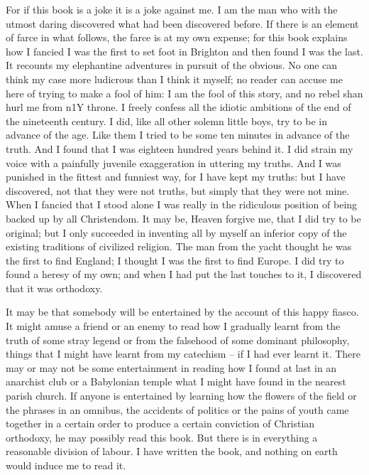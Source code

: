 \documentclass{book}
\begin{document}
For if this book is a joke it is a joke against me. I am the man who with the utmost daring discovered what had been discovered before. If there is an element of farce in what follows, the farce is at my own expense; for this book explains how I fancied I was the first to set foot in Brighton and then found I was the last. It recounts my elephantine adventures in pursuit of the obvious. No one can think my case more ludicrous than I think it myself; no reader can accuse me here of trying to make a fool of him: I am the fool of this story, and no rebel shan hurl me from n1Y throne. I freely confess all the idiotic ambitions of the end of the nineteenth century. I did, like all other solemn little boys, try to be in advance of the age. Like them I tried to be some ten minutes in advance of the truth. And I found that I was eighteen hundred years behind it. I did strain my voice with a painfully juvenile exaggeration in uttering my truths. And I was punished in the fittest and funniest way, for I have kept my truths: but I have discovered, not that they were not truths, but simply that they were not mine. When I fancied that I stood alone I was really in the ridiculous position of being backed up by all Christendom. It may be, Heaven forgive me, that I did try to be original; but I only succeeded in inventing all by myself an inferior copy of the existing traditions of civilized religion. The man from the yacht thought he was the first to find England; I thought I was the first to find Europe. I did try to found a heresy of my own; and when I had put the last touches to it, I discovered that it was orthodoxy.

It may be that somebody will be entertained by the account of this happy fiasco. It might amuse a friend or an enemy to read how I gradually learnt from the truth of some stray legend or from the falsehood of some dominant philosophy, things that I might have learnt from my catechism – if I had ever learnt it. There may or may not be some entertainment in reading how I found at last in an anarchist club or a Babylonian temple what I might have found in the nearest parish church. If anyone is entertained by learning how the flowers of the field or the phrases in an omnibus, the accidents of politics or the pains of youth came together in a certain order to produce a certain conviction of Christian orthodoxy, he may possibly read this book. But there is in everything a reasonable division of labour. I have written the book, and nothing on earth would induce me to read it.
\end{document}
